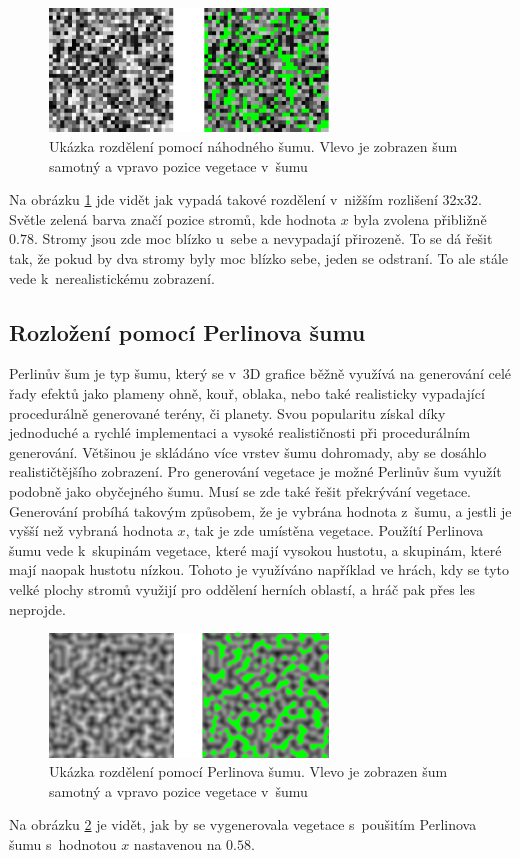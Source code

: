 \begin{figure}[H]
	\centering
	\includegraphics[width=20em]{images/generation/noise.png}
	\caption[caption]{Ukázka rozdělení pomocí náhodného šumu. Vlevo je zobrazen šum samotný a vpravo pozice vegetace v~šumu} 
	\label{rand_noise}
\end{figure}
Na obrázku \ref{rand_noise} jde vidět jak vypadá takové rozdělení v~nižším rozlišení 32x32. Světle zelená barva značí pozice stromů, kde hodnota $x$ byla zvolena přibližně $0.78$. Stromy jsou zde moc blízko u~sebe a nevypadají přirozeně. To se dá řešit tak, že pokud by dva stromy byly moc blízko sebe, jeden se odstraní. To ale stále vede k~nerealistickému zobrazení. 

\subsection*{Rozložení pomocí Perlinova šumu}
Perlinův šum je typ šumu, který se v~3D grafice běžně využívá na generování celé řady efektů jako plameny ohně, kouř, oblaka, nebo také realisticky vypadající procedurálně generované terény, či planety. Svou popularitu získal díky jednoduché a rychlé implementaci a vysoké realističnosti při procedurálním generování. Většinou je skládáno více vrstev šumu dohromady, aby se dosáhlo realističtějšího zobrazení. Pro generování vegetace je možné Perlinův šum využít podobně jako obyčejného šumu. Musí se zde také řešit překrývání vegetace. Generování probíhá takovým způsobem, že je vybrána hodnota z~šumu, a jestli je vyšší než vybraná hodnota $x$, tak je zde umístěna vegetace. Použítí Perlinova šumu vede k~skupinám vegetace, které mají vysokou hustotu, a skupinám, které mají naopak hustotu nízkou. Tohoto je využíváno například ve hrách, kdy se tyto velké plochy stromů využijí pro oddělení herních oblastí, a hráč pak přes les neprojde.
\begin{figure}[H]
	\centering
	\includegraphics[width=20em]{images/generation/perlin_noise.png}
	\caption[caption]{Ukázka rozdělení pomocí Perlinova šumu. Vlevo je zobrazen šum samotný a vpravo pozice vegetace v~šumu} 
	\label{perlin_noise}
\end{figure}
Na obrázku \ref{perlin_noise} je vidět, jak by se vygenerovala vegetace s~poušitím Perlinova šumu s~hodnotou $x$ nastavenou na $0.58$.

